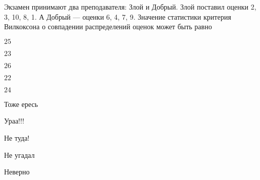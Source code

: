 
\begin{question}
Экзамен принимают два преподавателя: Злой и Добрый. Злой поставил оценки
2, 3, 10, 8, 1. А Добрый — оценки 6, 4, 7, 9. Значение статистики
критерия Вилкоксона о совпадении распределений оценок может быть равно
\begin{answerlist}
  \item \(25\)
  \item \(23\)
  \item \(26\)
  \item \(22\)
  \item \(24\)
\end{answerlist}
\end{question}

\begin{solution}
\begin{answerlist}
  \item Тоже ересь
  \item Ураа!!!
  \item Не туда!
  \item Не угадал
  \item Неверно
\end{answerlist}
\end{solution}

